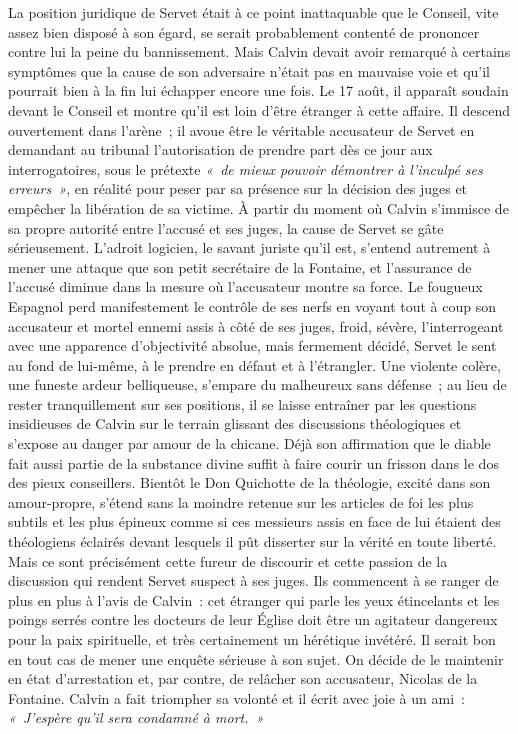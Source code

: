 \documentclass[french,twoside]{book} %
\begin{document}
La position juridique de Servet était à ce point inattaquable que le Conseil, vite assez bien disposé à son égard, se serait probablement contenté de prononcer contre lui la peine du bannissement. Mais Calvin devait avoir remarqué à certains symptômes que la cause de son adversaire n’était pas en mauvaise voie et qu’il pourrait bien à la fin lui échapper encore une fois. Le 17 août, il apparaît soudain devant le Conseil et montre qu’il est loin d’être étranger à cette affaire. Il descend ouvertement dans l’arène ; il avoue être le véritable accusateur de Servet en demandant au tribunal l’autorisation de prendre part dès ce jour aux interrogatoires, sous le prétexte \emph{« de mieux pouvoir démontrer à l’inculpé ses erreurs »}, en réalité pour peser par sa présence sur la décision des juges et empêcher la libération de sa victime. À partir du moment où Calvin s’immisce de sa propre autorité entre l’accusé et ses juges, la cause de Servet se gâte sérieusement. L’adroit logicien, le savant juriste qu’il est, s’entend autrement à mener une attaque que son petit secrétaire de la Fontaine, et l’assurance de l’accusé diminue dans la mesure où l’accusateur montre sa force. Le fougueux Espagnol perd manifestement le contrôle de ses nerfs en voyant tout à coup son accusateur et mortel ennemi assis à côté de ses juges, froid, sévère, l’interrogeant avec une apparence d’objectivité absolue, mais fermement décidé, Servet le sent au fond de lui-même, à le prendre en défaut et à l’étrangler. Une violente colère, une funeste ardeur belliqueuse, s’empare du malheureux sans défense ; au lieu de rester tranquillement sur ses positions, il se laisse entraîner par les questions insidieuses de Calvin sur le terrain glissant des discussions théologiques et s’expose au danger par amour de la chicane. Déjà son affirmation que le diable fait aussi partie de la substance divine suffit à faire courir un frisson dans le dos des pieux conseillers. Bientôt le Don Quichotte de la théologie, excité dans son amour-propre, s’étend sans la moindre retenue sur les articles de foi les plus subtils et les plus épineux comme si ces messieurs assis en face de lui étaient des théologiens éclairés devant lesquels il pût disserter sur la vérité en toute liberté. Mais ce sont précisément cette fureur de discourir et cette passion de la discussion qui rendent Servet suspect à ses juges. Ils commencent à se ranger de plus en plus à l’avis de Calvin : cet étranger qui parle les yeux étincelants et les poings serrés contre les docteurs de leur Église doit être un agitateur dangereux pour la paix spirituelle, et très certainement un hérétique invétéré. Il serait bon en tout cas de mener une enquête sérieuse à son sujet. On décide de le maintenir en état d’arrestation et, par contre, de relâcher son accusateur, Nicolas de la Fontaine. Calvin a fait triompher sa volonté et il écrit avec joie à un ami : \emph{« J’espère qu’il sera condamné à mort. »}\par
\end{document}
